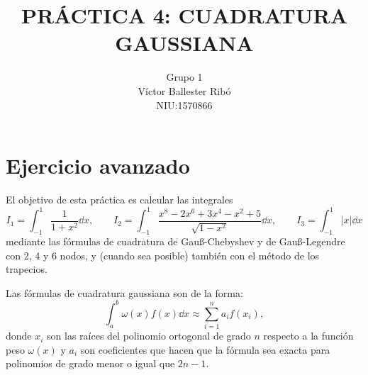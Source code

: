 \documentclass[a4paper]{article}
\title{\bfseries\Large PRÁCTICA 4: CUADRATURA GAUSSIANA}
\author{Grupo 1\\Víctor Ballester Ribó\\NIU:1570866}
\date{\parbox{\linewidth}{\centering
  Métodos numéricos\endgraf
  Grado en Matemáticas\endgraf
  Universitat Autònoma de Barcelona\endgraf
  4 de Junio de 2021}}
\begin{document}
\maketitle
\thispagestyle{empty}
\newpage
\setcounter{page}{1}
\restoregeometry
\section{Ejercicio avanzado}\label{ejercicioavanzado}
El objetivo de esta práctica es calcular las integrales
$$I_1=\int_{-1}^1\frac{1}{1+x^2}\dd x,\qquad I_2=\int_{-1}^1\frac{x^8-2x^6+3x^4-x^2+5}{\sqrt{1-x^2}}\dd x,\qquad I_3=\int_{-1}^1|x|\dd x$$ mediante las fórmulas de cuadratura de Gau\ss-Chebyshev y de Gau\ss-Legendre con 2, 4 y 6 nodos, y (cuando sea posible) también con el método de los trapecios.\par 
Las fórmulas de cuadratura gaussiana son de la forma: 
\begin{equation}
    \int_a^b\omega(x)f(x)\dd x\approx\sum_{i=1}^na_if(x_i),
    \label{gauss}
\end{equation}
donde $x_i$ son las raíces del polinomio ortogonal de grado $n$ respecto a la función peso $\omega(x)$ y $a_i$ son coeficientes que hacen que la fórmula sea exacta para polinomios de grado menor o igual que $2n-1$.
\end{document}
